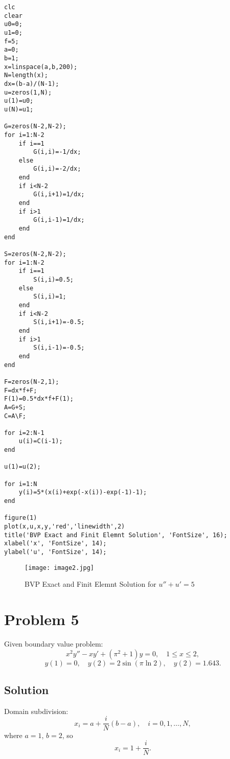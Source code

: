 \documentclass{article}
\begin{document}
\begin{tcolorbox}[title=Finite Element Method (Piecewise Linear Basis)]
\begin{lstlisting}
clc
clear
u0=0; 
u1=0; 
f=5; 
a=0; 
b=1; 
x=linspace(a,b,200); 
N=length(x); 
dx=(b-a)/(N-1);
u=zeros(1,N);
u(1)=u0;
u(N)=u1;

G=zeros(N-2,N-2); 
for i=1:N-2
    if i==1
        G(i,i)=-1/dx;
    else
        G(i,i)=-2/dx;
    end
    if i<N-2
        G(i,i+1)=1/dx;
    end
    if i>1
        G(i,i-1)=1/dx;
    end
end

S=zeros(N-2,N-2); 
for i=1:N-2
    if i==1
        S(i,i)=0.5;
    else
        S(i,i)=1;
    end
    if i<N-2
        S(i,i+1)=-0.5;
    end
    if i>1
        S(i,i-1)=-0.5;
    end
end

F=zeros(N-2,1);
F=dx*f+F;
F(1)=0.5*dx*f+F(1);
A=G+S;
C=A\F;

for i=2:N-1
    u(i)=C(i-1);
end

u(1)=u(2);

for i=1:N
    y(i)=5*(x(i)+exp(-x(i))-exp(-1)-1);
end

figure(1) 
plot(x,u,x,y,'red','linewidth',2)
title('BVP Exact and Finit Elemnt Solution', 'FontSize', 16);
xlabel('x', 'FontSize', 14);
ylabel('u', 'FontSize', 14);
\end{lstlisting}
\end{tcolorbox}

\begin{figure}[h!]
    \centering
    \texttt{[image: image2.jpg]}
    \caption{BVP Exact and Finit Elemnt Solution for $u'' + u' = 5$}
    \label{fig:fem_solution}
\end{figure}

\newpage

\section*{Problem 5}

Given boundary value problem:
\[
x^2 y'' - x y' + (\pi^2 + 1)y = 0, \quad 1 \leq x \leq 2,
\]
\[
y(1) = 0, \quad y(2) = 2 \sin(\pi \ln 2), \quad y(2) = 1.643.
\]

\subsection*{Solution}

Domain subdivision:
\[
x_i = a + \frac{i}{N} (b - a), \quad i = 0, 1, \dots, N,
\]
where $a = 1$, $b = 2$, so
\[
x_i = 1 + \frac{i}{N}.
\]
\end{document}
